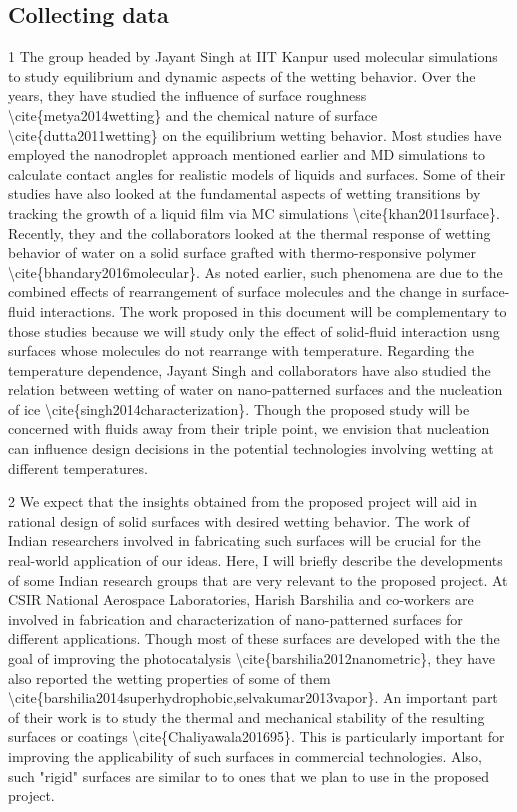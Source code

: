 \subsection{Collecting data}

\par 1 The group headed by Jayant Singh at IIT Kanpur used molecular simulations to study equilibrium and dynamic aspects of the wetting behavior. Over the years, they have studied the influence of surface roughness \textbackslash cite\{metya2014wetting\} and the chemical nature of surface \textbackslash cite\{dutta2011wetting\} on the equilibrium wetting behavior. Most studies have employed the nanodroplet approach mentioned earlier and MD simulations to calculate contact angles for realistic models of liquids and surfaces. Some of their studies have also looked at the fundamental aspects of wetting transitions by tracking the growth of a liquid film via MC simulations \textbackslash cite\{khan2011surface\}. Recently, they and the collaborators looked at the thermal response of wetting behavior of water on a solid surface grafted with thermo-responsive polymer \textbackslash cite\{bhandary2016molecular\}. As noted earlier, such phenomena are due to the combined effects of rearrangement of surface molecules and the change in surface-fluid interactions. The work proposed in this document will be complementary to those studies because we will study only the effect of solid-fluid interaction usng surfaces whose molecules do not rearrange with temperature. Regarding the temperature dependence, Jayant Singh and collaborators have also studied the relation between wetting of water on nano-patterned surfaces and the nucleation of ice \textbackslash cite\{singh2014characterization\}. Though the proposed study will be concerned with fluids away from their triple point, we envision that nucleation can influence design decisions in the potential technologies involving wetting at different temperatures.
\par 2 We expect that the insights obtained from the proposed project will aid in rational design of solid surfaces with desired wetting behavior. The work of Indian researchers involved in fabricating such surfaces will be crucial for the real-world application of our ideas. Here, I will briefly describe the developments of some Indian research groups that are very relevant to the proposed project. At CSIR National Aerospace Laboratories, Harish Barshilia and co-workers are involved in fabrication and characterization of nano-patterned surfaces for different applications. Though most of these surfaces are developed with the the goal of improving the photocatalysis \textbackslash cite\{barshilia2012nanometric\}, they have also reported the wetting properties of some of them \textbackslash cite\{barshilia2014superhydrophobic,selvakumar2013vapor\}. An important part of their work is to study the thermal and mechanical stability of the resulting surfaces or coatings \textbackslash cite\{Chaliyawala201695\}. This is particularly important for improving the applicability of such surfaces in commercial technologies. Also, such "rigid" surfaces are similar to to ones that we plan to use in the proposed project.
